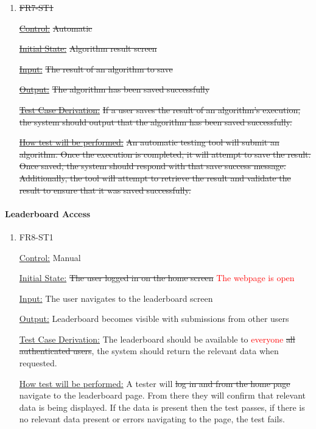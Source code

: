 \documentclass[12pt, titlepage]{article}
\begin{document}
\begin{enumerate}

\item{\sout{FR7-ST1\\}}

\underline{\sout{Control:}} \sout{Automatic} 

\underline{\sout{Initial State:}} \sout{Algorithm result screen}

\underline{\sout{Input:}} \sout{The result of an algorithm to save}

\underline{\sout{Output:}} \sout{The algorithm has been saved successfully}

\underline{\sout{Test Case Derivation:}} \sout{If a user saves the result of an algorithm's execution, the system should output that the algorithm has been saved successfully.}

\underline{\sout{How test will be performed:}} \sout{An automatic testing tool will submit an algorithm. Once the execution is completed, it will attempt to save the result. Once saved, the system should respond with that save success message. Additionally, the tool will attempt to retrieve the result and validate the result to ensure that it was saved successfully.}

\end{enumerate}

\paragraph{Leaderboard Access}

\begin{enumerate}

\item{FR8-ST1\\}

\underline{Control:} Manual

\underline{Initial State:} \sout{The user logged in on the home screen} \textcolor{red}{The webpage is open}

\underline{Input:} The user navigates to the leaderboard screen

\underline{Output:} Leaderboard becomes visible with submissions from other users

\underline{Test Case Derivation:} The leaderboard should be available to \textcolor{red}{everyone} \sout{all authenticated users}, the system should return the relevant data when requested.

\underline{How test will be performed:} A tester will \sout{log in and from the home page} navigate to the leaderboard page. From there they will confirm that relevant data is being displayed. If the data is present then the test passes, if there is no relevant data present or errors navigating to the page, the test fails.

\end{enumerate}
\end{document}
